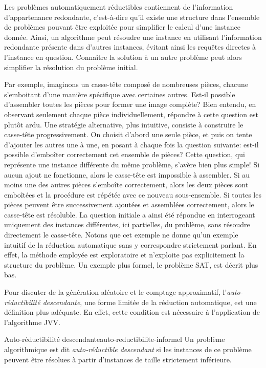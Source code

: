 Les problèmes automatiquement réductibles contiennent de l'information d'appartenance redondante, c'est-à-dire qu'il existe une structure dans l'ensemble de problèmes pouvant être exploitée pour simplifier le calcul d'une instance donnée. Ainsi, un algorithme peut résoudre une instance en utilisant l'information redondante présente dans d'autres instances, évitant ainsi les requêtes directes à l'instance en question. Connaître la solution à un autre problème peut alors simplifier la résolution du problème initial. 

Par exemple, imaginons un casse-tête composé de nombreuses pièces, chacune s'emboitant d'une manière spécifique avec certaines autres. Est-il possible d'assembler toutes les pièces pour former une image complète? Bien entendu, en observant seulement chaque pièce individuellement, répondre à cette question est plutôt ardu. Une stratégie alternative, plus intuitive, consiste à construire le casse-tête progressivement. On choisit d'abord une seule pièce, et puis on tente d'ajouter les autres une à une, en posant à chaque fois la question suivante: est-il possible d'emboîter correctement cet ensemble de pièces? Cette question, qui représente une instance différente du même problème, s'avère bien plus simple! Si aucun ajout ne fonctionne, alors le casse-tête est impossible à assembler. Si au moins une des autres pièces s'emboîte correctement, alors les deux pièces sont emboîtées et la procédure est répétée avec ce nouveau sous-ensemble. Si toutes les pièces peuvent être successivement ajoutées et assemblées correctement, alors le casse-tête est résoluble. La question initiale a ainsi été répondue en interrogeant uniquement des instances différentes, ici partielles, du problème, sans résoudre directement le casse-tête. Notons que cet exemple ne donne qu'un exemple intuitif de la réduction automatique sans y correspondre strictement parlant. En effet, la méthode employée est exploratoire et n'exploite pas explicitement la structure du problème. Un exemple plus formel, le problème SAT, est décrit plus bas.

Pour discuter de la génération aléatoire et le comptage approximatif, l'\textit{auto-réductibilité descendante}, une forme limitée de la réduction automatique, est une définition plus adéquate. En effet, cette condition est nécessaire à l'application de l'algorithme JVV.

\begin{maindefinition}{Auto-réductibilité descendante}{auto-reductibilite-informel}
    Un problème algorithmique est dit \textit{auto-réductible descendant} si les instances de ce problème peuvent être résolues à partir d'instances de taille strictement inférieure.
\end{maindefinition}

